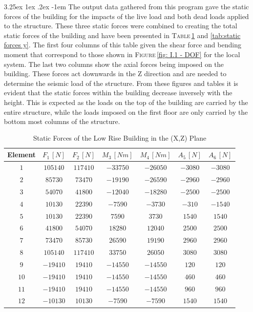 \documentclass[11pt,a4paper,titlepage]{report}
\makeatletter
\renewcommand\paragraph{\@startsection{paragraph}{5}{\z@}%
  {3.25ex \@plus1ex \@minus.2ex}%
  {-1em}%
  {\normalfont\normalsize\bfseries}}
\makeatother
\begin{document}
\paragraph{}The output data gathered from this program gave the static forces of the building for the impacts of the live load and both dead loads applied to the structure. These three static forces were combined to creating the total static forces of the building and have been presented in \textsc{Table}\,\ref{tab:static forces x} and \ref{tab:static forces y}. The first four columns of this table given the shear force and bending moment that correspond to those shown in \textsc{Figure}\,\ref{fig: I.1 - DOF} for the local system. The last two columns show the axial forces being imposed on the building. These forces act downwards in the Z direction and are needed to determine the seismic load of the structure. From these figures and tables it is evident that the static forces within the building decrease inversely with the height. This is expected as the loads on the top of the building are carried by the entire structure, while the loads imposed on the first floor are only carried by the bottom most columns of the structure.
\begin{table}[h]
    \centering
    \begin{tabular}{c|c|c|c|c|c|c}
     Element & $F_1\,[N]$ & $F_2 \,[N]$ & $M_3 \,[Nm]$ & $M_4\, [Nm]$ & $A_5 \,[N]$ & $A_6\, [N]$ \\
         \hline
    $1$ & $105140$ & $117410$ & $-33750$ & $-26050$ & $-3080$ & $-3080$ \\
    $2$ & $85730$ & $73470$ & $-19190$ & $-26590$ & $-2960$ & $-2960$ \\
    $3$ & $54070$ & $41800$ & $-12040$ & $-18280$ & $-2500$ & $-2500$ \\
    $4$ & $10130$ & $22390$ & $-7590$ & $-3730$ & $-310$ & $-1540$ \\
    $5$ & $10130$ & $22390$ & $7590$ & $3730$ & $1540$ & $1540$ \\
    $6$ & $41800$ & $54070$ & $18280$ & $12040$ & $2500$ & $2500$ \\
    $7$ & $73470$ & $85730$ & $26590$ & $19190$ & $2960$ & $2960$ \\
    $8$ & $105140$ & $117410$ & $33750$ & $26050$ & $3080$ & $3080$ \\
    $9$ & $-19410$ & $19410$ & $-14550$ & $-14550$ & $120$ & $120$ \\
    $10$ & $-19410$ & $19410$ & $-14550$ & $-14550$ & $460$ & $460$ \\
    $11$ & $-19410$ & $19410$ & $-14550$ & $-14550$ & $960$ & $960$ \\
    $12$ & $-10130$ & $10130$ & $-7590$ & $-7590$ & $1540$ & $1540$ \\
    \end{tabular}
    \caption{Static Forces of the Low Rise Building in the (X,Z) Plane}
    \label{tab:static forces x}
\end{table}
\end{document}

